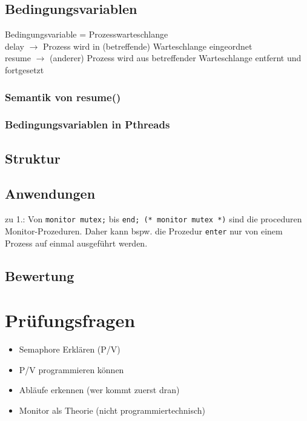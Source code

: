 \subsection{Bedingungsvariablen}
Bedingungsvariable = Prozesswarteschlange\\
delay $\to$ Prozess wird in (betreffende) Warteschlange eingeordnet\\
resume $\to$ (anderer) Prozess wird aus betreffender Warteschlange entfernt und fortgesetzt
\subsubsection{Semantik von resume()}
\subsubsection{Bedingungsvariablen in Pthreads}
\subsection{Struktur}
\subsection{Anwendungen}
zu 1.:
%
Von \lstinline$monitor mutex;$ bis \lstinline$end; (* monitor mutex *)$ sind die proceduren Monitor-Pro\-ze\-du\-ren. Daher kann bspw. die Prozedur \lstinline$enter$ nur von einem Prozess auf einmal ausgeführt werden.

\subsection{Bewertung}

\section{Prüfungsfragen}
\begin{itemize}
\item Semaphore Erklären (P/V)
\item P/V programmieren können
\item Abläufe erkennen (wer kommt zuerst dran)
\item Monitor als Theorie (nicht programmiertechnisch)
\end{itemize}